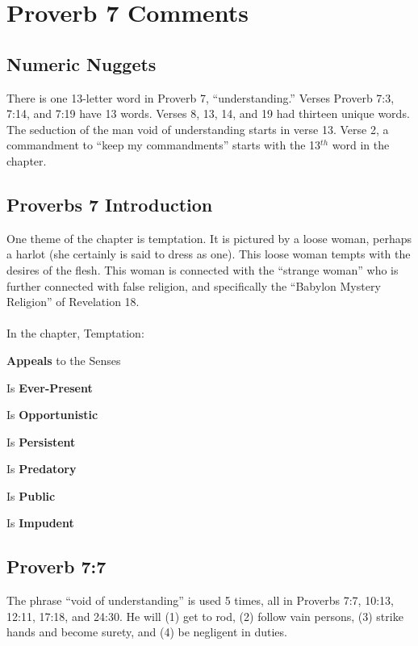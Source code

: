 \section{Proverb 7 Comments}

\subsection{Numeric Nuggets}
There is one 13-letter word in Proverb 7, ``understanding.'' Verses Proverb 7:3, 7:14, and 7:19 have 13 words. Verses 8, 13, 14, and 19 had thirteen unique words. The seduction of the man void of understanding starts in verse 13. Verse 2, a commandment to ``keep my commandments'' starts with the 13$^{th}$ word in the chapter.

\subsection{Proverbs 7 Introduction}
One theme of the chapter is temptation. It is pictured by a loose woman, perhaps a harlot (she certainly is said to dress as one). This loose woman tempts with the desires of the flesh. This woman is connected with the ``strange woman'' who is further connected with false religion, and specifically the ``Babylon Mystery Religion'' of Revelation 18.\\
\\
\noindent In the chapter, Temptation:
\begin{compactenum}
    \item \textbf{Appeals} to the Senses
    \item Is \textbf{Ever-Present}
    \item Is \textbf{Opportunistic}
    \item Is \textbf{Persistent}
    \item Is \textbf{Predatory}
    \item Is \textbf{Public}
    \item Is \textbf{Impudent}
\end{compactenum}

\subsection{Proverb 7:7}
The phrase ``void of understanding'' is used 5 times, all in Proverbs 7:7, 10:13, 12:11, 17:18, and 24:30. He will (1) get to rod, (2) follow vain persons, (3) strike hands and become surety, and (4) be negligent in duties.

